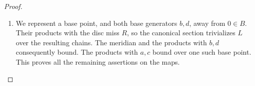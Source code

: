 \begin{proof}
\begin{enumerate}[label={$\langle1\rangle$\arabic*.},leftmargin=*]
\item We represent a base point, and both base generators $b,d$, away from
$0\in B$. Their products with the disc miss $R$, so the canonical section
trivializes $L$ over the resulting chains. The meridian and the products
with $b,d$ consequently bound. The products with $a,c$ bound over one
such base point. This proves all the remaining assertions on the maps.

\end{enumerate}
\end{proof}